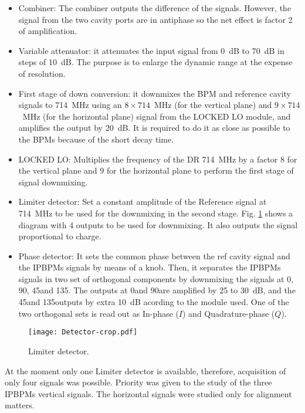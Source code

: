\begin{itemize}
 \item Combiner: The combiner outputs the difference of the signals. However, the signal from the two cavity ports are in antiphase so the net effect is factor 2 of amplification.\par
 \item Variable attenuator: it attenuates the input signal from 0~dB to 70~dB in steps of 10~dB. The purpose is to enlarge the dynamic range at the expense of resolution.\par
 \item First stage of down conversion: it downmixes the BPM and reference cavity signals to 714~MHz using an $8\times714$~MHz (for the vertical plane) and $9\times714$~MHz (for the horizontal plane) signal from the LOCKED LO module, and amplifies the output by 20~dB. It is required to do it as close as possible to the BPMs because of the short decay time.\par
 \item LOCKED LO: Multiplies the frequency of the DR 714~MHz by a factor 8 for the vertical plane and 9 for the horizontal plane to perform the first stage of signal downmixing.\par
 \item Limiter detector: Set a constant amplitude of the Reference signal at 714~MHz to be used for the downmixing in the second stage. Fig. \ref{f:detector} shows a diagram with 4 outputs to be used for downmixing. It also outputs the signal proportional to charge.\par
 \item Phase detector: It sets the common phase between the ref cavity signal and the IPBPMs signals by means of a knob. Then, it separates the IPBPMs signals in two set of orthogonal components by downmixing the signals at 0\textdegree, 90\textdegree, 45\textdegree and 135\textdegree. The outputs at 0\textdegree and 90\textdegree are amplified by 25 to 30~dB, and the 45\textdegree and 135\textdegree outputs by extra 10~dB acording to the module used. One of the two orthogonal sets is read out as In-phase ($I$) and Quadrature-phase ($Q$).\par
\end{itemize}
\begin{figure}[htb]
 \centering%
 \texttt{[image: Detector-crop.pdf]}\caption{Limiter detector.}\label{f:detector}
\end{figure}
At the moment only one Limiter detector is available, therefore, acquisition of only four signals was possible. Priority was given to the study of the three IPBPMs vertical signals. The horizontal signals were studied only for alignment matters.\par
